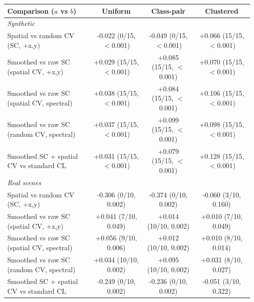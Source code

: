 \begin{tabular}{l ccc}
\toprule
Comparison ($a$ vs $b$) & Uniform & Class-pair & Clustered \\
\midrule
\multicolumn{4}{l}{\textit{Synthetic}} \\
Spatial vs random CV (SC, +x,y) & -0.022 (0/15, $<$0.001) & -0.049 (0/15, $<$0.001) & +0.066 (15/15, $<$0.001) \\
Smoothed vs raw SC (spatial CV, +x,y) & +0.029 (15/15, $<$0.001) & +0.085 (15/15, $<$0.001) & +0.070 (15/15, $<$0.001) \\
Smoothed vs raw SC (spatial CV, spectral) & +0.038 (15/15, $<$0.001) & +0.084 (15/15, $<$0.001) & +0.106 (15/15, $<$0.001) \\
Smoothed vs raw SC (random CV, spectral) & +0.037 (15/15, $<$0.001) & +0.099 (15/15, $<$0.001) & +0.098 (15/15, $<$0.001) \\
Smoothed SC + spatial CV vs standard CL & +0.031 (15/15, $<$0.001) & +0.079 (15/15, $<$0.001) & +0.128 (15/15, $<$0.001) \\
\midrule
\multicolumn{4}{l}{\textit{Real scenes}} \\
Spatial vs random CV (SC, +x,y) & -0.306 (0/10, 0.002) & -0.374 (0/10, 0.002) & -0.060 (3/10, 0.160) \\
Smoothed vs raw SC (spatial CV, +x,y) & +0.041 (7/10, 0.049) & +0.014 (10/10, 0.002) & +0.010 (7/10, 0.049) \\
Smoothed vs raw SC (spatial CV, spectral) & +0.056 (9/10, 0.006) & +0.012 (10/10, 0.002) & +0.010 (8/10, 0.014) \\
Smoothed vs raw SC (random CV, spectral) & +0.034 (10/10, 0.002) & +0.095 (10/10, 0.002) & +0.031 (8/10, 0.027) \\
Smoothed SC + spatial CV vs standard CL & -0.249 (0/10, 0.002) & -0.236 (0/10, 0.002) & -0.051 (3/10, 0.322) \\
\bottomrule
\end{tabular}
